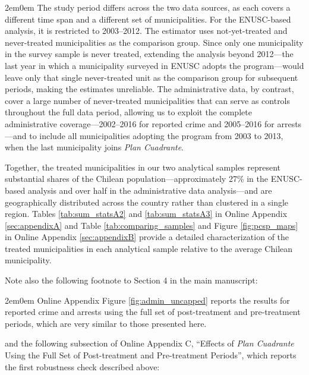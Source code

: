 \begin{adjustwidth}{2em}{0em}
The study period differs across the two data sources, as each covers a different time span and a different set of municipalities. For the ENUSC-based analysis, it is restricted to 2003--2012. The \citet{Callaway} estimator uses not-yet-treated and never-treated municipalities as the comparison group. Since only one municipality in the survey sample is never treated, extending the analysis beyond 2012---the last year in which a municipality surveyed in ENUSC adopts the program---would leave only that single never-treated unit as the comparison group for subsequent periods, making the estimates unreliable. The administrative data, by contrast, cover a large number of never-treated municipalities that can serve as controls throughout the full data period, allowing us to exploit the complete administrative coverage---2002--2016 for reported crime and 2005--2016 for arrests---and to include all municipalities adopting the program from 2003 to 2013, when the last municipality joins \emph{Plan Cuadrante}.

Together, the treated municipalities in our two analytical samples represent substantial shares of the Chilean population---approximately 27\% in the ENUSC-based analysis and over half in the administrative data analysis---and are geographically distributed across the country rather than clustered in a single region. Tables \ref{tab:sum_statsA2} and \ref{tab:sum_statsA3} in Online Appendix \ref{sec:appendixA} and Table \ref{tab:comparing_samples} and Figure \ref{fig:pcsp_maps} in Online Appendix \ref{sec:appendixB} provide a detailed characterization of the treated municipalities in each analytical sample relative to the average Chilean municipality.
\end{adjustwidth}

Note also the following footnote to Section 4 in the main manuscript:

\begin{adjustwidth}{2em}{0em}
Online Appendix Figure \ref{fig:admin_uncapped} reports the results for reported crime and arrests using the full set of post-treatment and pre-treatment periods, which are very similar to those presented here.
\end{adjustwidth}

and the following subsection of Online Appendix C, ``Effects of \emph{Plan Cuadrante} Using the Full Set of Post-treatment and Pre-treatment Periods'', which reports the first robustness check described above:

